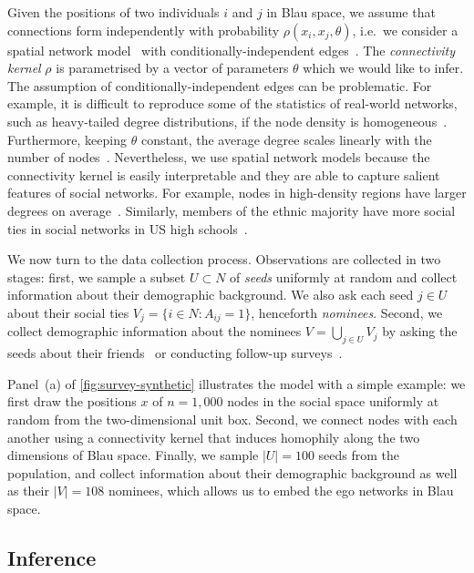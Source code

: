 \documentclass{scrartcl}
\newcommand{\card}[1]{\left|#1\right|}
\newcommand{\population}{N}
\newcommand{\seeds}{U}
\newcommand{\nominees}{V}
\begin{document}
Given the positions of two individuals $i$ and $j$ in Blau space, we assume that connections form independently with probability $\rho(x_i, x_j,\theta)$, i.e.\ we consider a spatial network model~\cite{Barnett2007} with conditionally-independent edges~\cite{Fienberg2012}. The \emph{connectivity kernel} $\rho$ is parametrised by a vector of parameters $\theta$ which we would like to infer. The assumption of conditionally-independent edges can be problematic. For example, it is difficult to reproduce some of the statistics of real-world networks, such as heavy-tailed degree distributions, if the node density is homogeneous~\cite{Barnett2007}. Furthermore, keeping $\theta$ constant, the average degree scales linearly with the number of nodes~\cite{Caron2017}. Nevertheless, we use spatial network models because the connectivity kernel is easily interpretable and they are able to capture salient features of social networks. For example, nodes in high-density regions have larger degrees on average~\cite{Barnett2007}. Similarly, members of the ethnic majority have more social ties in social networks in US high schools~\cite{Currarini2009}.

We now turn to the data collection process. Observations are collected in two stages: first, we sample a subset $\seeds\subset\population$ of \emph{seeds} uniformly at random and collect information about their demographic background. We also ask each seed $j\in \seeds$ about their social ties $\nominees_j=\{i\in\population:A_{ij}=1\}$, henceforth \emph{nominees}. Second, we collect demographic information about the nominees $\nominees=\bigcup_{j\in \seeds} \nominees_j$ by asking the seeds about their friends~\cite{Huckfeldt1983, McPherson2006, Kalmijn2007} or conducting follow-up surveys~\cite{Johnson1989}.

Panel~(a) of \cref{fig:survey-synthetic} illustrates the model with a simple example: we first draw the positions $x$ of $n=1,000$ nodes in the social space uniformly at random from the two-dimensional unit box. Second, we connect nodes with each another using a connectivity kernel that induces homophily along the two dimensions of Blau space. Finally, we sample $\card{\seeds}=100$ seeds from the population, and collect information about their demographic background as well as their $\card{\nominees}=108$ nominees, which allows us to embed the ego networks in Blau space.

\subsection{Inference}
\end{document}
